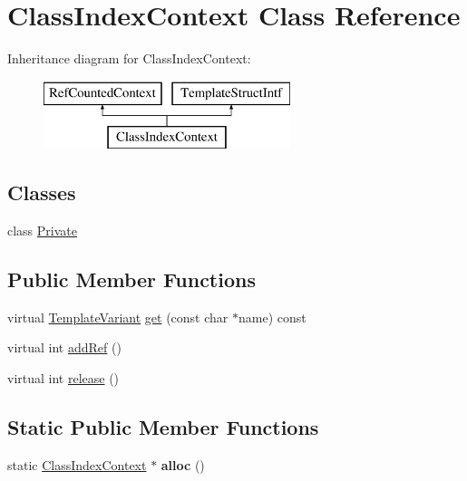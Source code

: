 \hypertarget{class_class_index_context}{}\section{Class\+Index\+Context Class Reference}
\label{class_class_index_context}
Inheritance diagram for Class\+Index\+Context\+:\begin{figure}[H]
\begin{center}
\leavevmode
\includegraphics[height=2.000000cm]{class_class_index_context}
\end{center}
\end{figure}
\subsection*{Classes}
\begin{DoxyCompactItemize}
\item 
class \mbox{\hyperlink{class_class_index_context_1_1_private}{Private}}
\end{DoxyCompactItemize}
\subsection*{Public Member Functions}
\begin{DoxyCompactItemize}
\item 
virtual \mbox{\hyperlink{class_template_variant}{Template\+Variant}} \mbox{\hyperlink{class_class_index_context_a5353dbdd14faccb6f1e8a7487cf061b0}{get}} (const char $\ast$name) const
\item 
virtual int \mbox{\hyperlink{class_class_index_context_a0bf6831cd085ad22ded6b29bfcb8f0bd}{add\+Ref}} ()
\item 
virtual int \mbox{\hyperlink{class_class_index_context_ade13f5057c83883e9cb22b5ccd2eead6}{release}} ()
\end{DoxyCompactItemize}
\subsection*{Static Public Member Functions}
\begin{DoxyCompactItemize}
\item 
\mbox{\label{class_class_index_context_a1955976d7c7f2ed3aa099e49e87c03b2}} 
static \mbox{\hyperlink{class_class_index_context}{Class\+Index\+Context}} $\ast$ {\bfseries alloc} ()
\end{DoxyCompactItemize}


